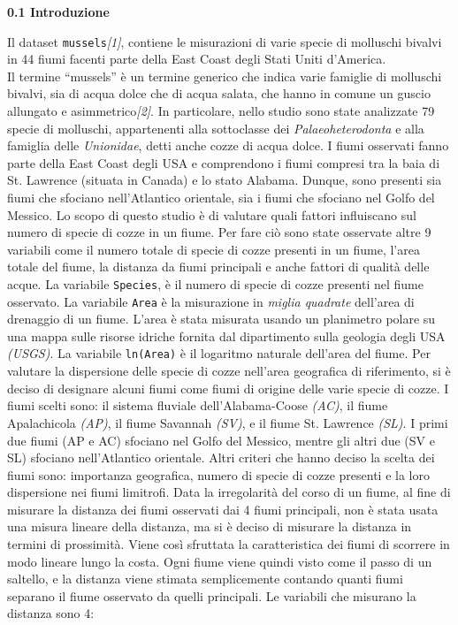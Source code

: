 \documentclass{article} %
\begin{document}
\newpage
\begin{flushleft}
\textbf{\Large 0.1 \: Introduzione}    
\end{flushleft}

Il dataset \texttt{mussels}\textit{[1]}, contiene le misurazioni di varie specie di molluschi bivalvi  in 44 fiumi facenti parte della East Coast degli Stati Uniti d'America.\\ 
Il termine “mussels” è un termine generico che indica varie famiglie di molluschi bivalvi, sia di acqua dolce che di acqua salata, che hanno in comune un guscio allungato e asimmetrico\textit{[2]}. In particolare, nello studio sono state analizzate 79 specie di molluschi, appartenenti alla sottoclasse dei \textit{Palaeoheterodonta} e alla famiglia delle \textit{Unionidae}, detti anche cozze di acqua dolce. 
I fiumi osservati fanno parte della East Coast degli USA e comprendono i fiumi compresi tra la baia di St. Lawrence (situata in Canada) e lo stato Alabama. Dunque, sono presenti sia fiumi che sfociano nell'Atlantico orientale, sia i fiumi che sfociano nel Golfo del Messico. 
Lo scopo di questo studio è di valutare quali fattori influiscano sul numero di specie di cozze in un fiume. Per fare ciò sono state osservate altre 9 variabili come il numero totale di specie di cozze presenti in un fiume, l'area totale del fiume, la distanza da fiumi principali e anche fattori di qualità delle acque. 
La variabile \texttt{Species}, è il numero di specie di cozze presenti nel fiume osservato. 
La variabile \texttt{Area} è la misurazione in \textit{miglia quadrate} dell'area di drenaggio di un fiume. L'area è stata misurata usando un planimetro polare su una mappa sulle risorse idriche fornita dal dipartimento sulla geologia degli USA \textit{(USGS)}.  
La variabile \texttt{ln(Area)} è il logaritmo naturale dell'area del fiume.
Per valutare la dispersione delle specie di cozze nell'area geografica di riferimento, si è deciso di designare alcuni fiumi come fiumi di origine delle varie specie di cozze. 
I fiumi scelti sono: il sistema fluviale dell'Alabama-Coose \textit{(AC)}, il fiume Apalachicola \textit{(AP)}, il fiume Savannah \textit{(SV)}, e il fiume St. Lawrence \textit{(SL)}. I primi due fiumi (AP e AC) sfociano nel Golfo del Messico, mentre gli altri due (SV e SL) sfociano nell'Atlantico orientale. Altri criteri che hanno deciso la scelta dei fiumi sono: importanza geografica, numero di specie di cozze presenti e la loro dispersione nei fiumi limitrofi. Data la irregolarità del corso di un fiume, al fine di misurare la distanza dei fiumi osservati dai 4 fiumi principali, non è stata usata una misura lineare della distanza, ma si è deciso di misurare la distanza in termini di prossimità. Viene così sfruttata la caratteristica dei fiumi di scorrere in modo lineare lungo la costa. Ogni fiume viene quindi visto come il passo di un saltello, e la distanza viene stimata semplicemente contando quanti fiumi separano il fiume osservato da quelli principali. Le variabili che misurano la distanza sono 4: 
\end{document}

